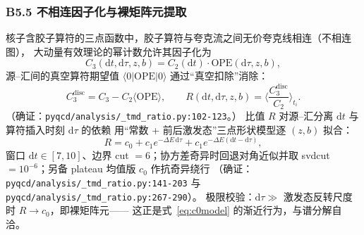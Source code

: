 \documentclass[UTF8]{ctexart}
\begin{document}
\subsubsection{B5.5 不相连因子化与裸矩阵元提取}
核子含胶子算符的三点函数中，胶子算符与夸克流之间无价夸克线相连（不相连图），
大动量有效理论的幂计数允许其因子化为
\begin{equation}
C_3(\mathrm d t,\mathrm d\tau,z,b)=C_2(\mathrm d t)\cdot
\mathrm{OPE}(\mathrm d\tau,z,b),
\label{eq:factorize}
\end{equation}
源--汇间的真空算符期望值 $\langle0|\mathrm{OPE}|0\rangle$ 通过``真空扣除''消除：
\begin{equation}
C_3^{\mathrm{disc}}=C_3-C_2\langle\mathrm{OPE}\rangle,\qquad
R(\mathrm d t,\mathrm d\tau,z,b)=\Big\langle\frac{C_3^{\mathrm{disc}}}{C_2}\Big\rangle_{t_i}.
\label{eq:vacsub}
\end{equation}
（确证：\texttt{\nolinkurl{pyqcd/analysis/_tmd_ratio.py:102-123}}。）
比值 $R$ 对源--汇分离 $\mathrm dt$ 与算符插入时刻 $\mathrm d\tau$ 的依赖
用``常数 + 前后激发态''三点形状模型逐 $(z,b)$ 拟合：
\begin{equation}
R=c_0+c_1e^{-\Delta E\,\mathrm d\tau}+c_1e^{-\Delta E(\mathrm dt-\mathrm d\tau)},
\label{eq:c0model}
\end{equation}
窗口 $\mathrm dt\in[7,10]$、边界 cut $=6$；协方差奇异时回退对角近似并取
svdcut$=10^{-6}$；另备 plateau 均值版 $c_0$ 作抗奇异绕行
（确证：\texttt{\nolinkurl{pyqcd/analysis/_tmd_ratio.py:141-203}} 与
\texttt{\nolinkurl{pyqcd/analysis/_tmd_ratio.py:267-290}}）。
极限校验：$\mathrm d\tau\gg$ 激发态反转尺度时 $R\to c_0$，即裸矩阵元——
这正是式~\eqref{eq:c0model} 的渐近行为，与谱分解自洽。
\end{document}
